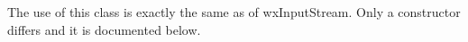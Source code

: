 \section{}\label{wxfilterinputstream}




The use of this class is exactly the same as of wxInputStream. Only a constructor
differs and it is documented below.



